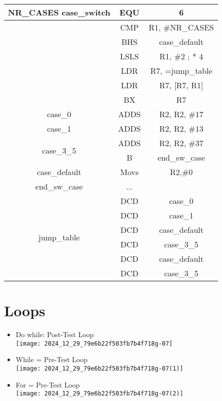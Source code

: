     \begin{center}
    \begin{tabular}{|c|c|c|}
    \hline
    \multirow[t]{7}{*}{NR\_CASES case\_switch} & EQU & 6 \\
    \hline
     & CMP & R1, \#NR\_CASES \\
    \hline
     & BHS & case\_default \\
    \hline
     & LSLS & R1, \#2 ; * 4 \\
    \hline
     & LDR & R7, =jump\_table \\
    \hline
     & LDR & R7, [R7, R1] \\
    \hline
     & BX & R7 \\
    \hline
    case\_0 & ADDS & R2, R2, \#17 \\
    \hline
    case\_1 & ADDS & R2, R2, \#13 \\
    \hline
    \multirow[t]{2}{*}{case\_3\_5} & ADDS & R2, R2, \#37 \\
    \hline
     & B & end\_sw\_case \\
    \hline
    case\_default & Movs & R2,\#0 \\
    \hline
    end\_sw\_case & ... &  \\
    \hline
    \multirow[t]{6}{*}{jump\_table} & DCD & case\_0 \\
    \hline
     & DCD & case\_1 \\
    \hline
     & DCD & case\_default \\
    \hline
     & DCD & case\_3\_5 \\
    \hline
     & DCD & case\_default \\
    \hline
     & DCD & case\_3\_5 \\
    \hline
    \end{tabular}
    \end{center}
    
    \section*{Loops}
    \begin{itemize}
      \item Do while: Post-Test Loop\\
    \texttt{[image: 2024\_12\_29\_79e6b22f503fb7b4f718g-07]}
      \item While = Pre-Test Loop\\
    \texttt{[image: 2024\_12\_29\_79e6b22f503fb7b4f718g-07(1)]}
      \item For = Pre-Test Loop\\
    \texttt{[image: 2024\_12\_29\_79e6b22f503fb7b4f718g-07(2)]}
    \end{itemize}
